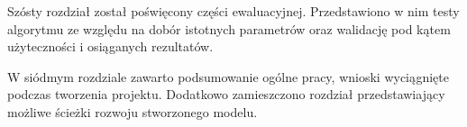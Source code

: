 Szósty rozdział został poświęcony części ewaluacyjnej. Przedstawiono w nim testy algorytmu ze względu na dobór istotnych parametrów oraz walidację pod kątem użyteczności i osiąganych rezultatów. 

W siódmym rozdziale zawarto podsumowanie ogólne pracy, wnioski wyciągnięte podczas tworzenia projektu. Dodatkowo zamieszczono rozdział przedstawiający możliwe ścieżki rozwoju stworzonego modelu.













